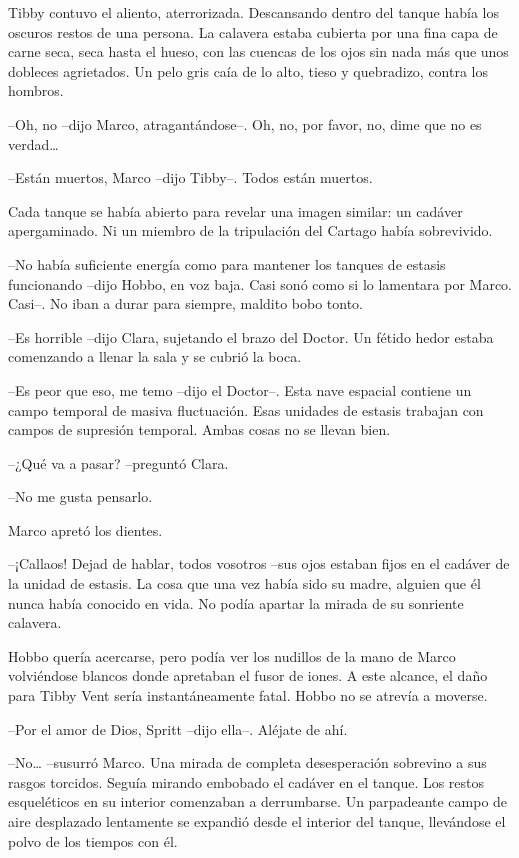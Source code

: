 {Tibby contuvo el aliento, aterrorizada. Descansando dentro del tanque
 había los oscuros restos de una persona. La calavera estaba cubierta por
 una fina capa de carne seca, seca hasta el hueso, con las cuencas de los
 ojos sin nada más que unos dobleces agrietados. Un pelo gris caía de lo
alto, tieso y quebradizo, contra los hombros.}

{--Oh, no --dijo Marco, atragantándose--. Oh, no, por favor, no, dime que
 no es verdad\ldots{}}

{--Están muertos, Marco --dijo Tibby--. Todos están muertos.}

{Cada tanque se había abierto para revelar una imagen similar: un cadáver
 apergaminado. Ni un miembro de la tripulación del Cartago había
sobrevivido.}

{--No había suficiente energía como para mantener los tanques de estasis
 funcionando --dijo Hobbo, en voz baja. Casi sonó como si lo lamentara
por Marco. Casi--. No iban a durar para siempre, maldito bobo tonto.}

{--Es horrible --dijo Clara, sujetando el brazo del Doctor. Un fétido
hedor estaba comenzando a llenar la sala y se cubrió la boca.}

{--Es peor que eso, me temo --dijo el Doctor--. Esta nave espacial
 contiene un campo temporal de masiva fluctuación. Esas unidades de
 estasis trabajan con campos de supresión temporal. Ambas cosas no se
llevan bien.}

{--¿Qué va a pasar? --preguntó Clara.}

{--No me gusta pensarlo.}

{Marco apretó los dientes.}

{--¡Callaos! Dejad de hablar, todos vosotros --sus ojos estaban fijos en
 el cadáver de la unidad de estasis. La cosa que una vez había sido su
 madre, alguien que él nunca había conocido en vida. No podía apartar la
mirada de su sonriente calavera.}

{Hobbo quería acercarse, pero podía ver los nudillos de la mano de Marco
 volviéndose blancos donde apretaban el fusor de iones. A este alcance,
 el daño para Tibby Vent sería instantáneamente fatal. Hobbo no se
atrevía a moverse.}

{--Por el amor de Dios, Spritt --dijo ella--. Aléjate de ahí.}

{--No\ldots{} --susurró Marco. Una mirada de completa desesperación
 sobrevino a sus rasgos torcidos. Seguía mirando embobado el cadáver en
 el tanque. Los restos esqueléticos en su interior comenzaban a
 derrumbarse. Un parpadeante campo de aire desplazado lentamente se
 expandió desde el interior del tanque, llevándose el polvo de los
tiempos con él.}

